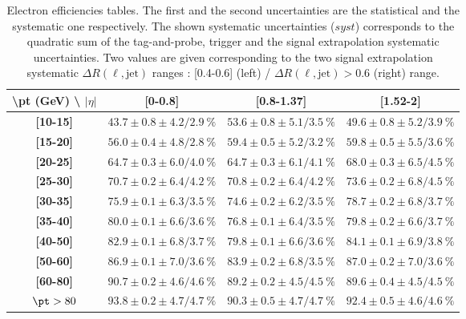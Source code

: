 \begin{table}[htb!]
	\begin{center}
\begin{tabular}{|c|c|c|c|}
\hline 
\textbf{\textbackslash{}pt (GeV) \textbackslash{} $|\eta|$} & \textbf{{[}0-0.8{]}} & \textbf{{[}0.8-1.37{]}} & \textbf{{[}1.52-2{]}}\tabularnewline
\hline 
\hline 
\textbf{{[}10-15{]}} & $43.7\pm0.8\pm4.2/2.9~\%$ & $53.6\pm0.8\pm5.1/3.5~\%$ & $49.6\pm0.8\pm5.2/3.9~\%$\tabularnewline
\hline 
\textbf{{[}15-20{]}} & $56.0\pm0.4\pm4.8/2.8~\%$ & $59.4\pm0.5\pm5.2/3.2~\%$ & $59.8\pm0.5\pm5.5/3.6~\%$\tabularnewline
\hline 
\textbf{{[}20-25{]}} & $64.7\pm0.3\pm6.0/4.0~\%$ & $64.7\pm0.3\pm6.1/4.1~\%$ & $68.0\pm0.3\pm6.5/4.5~\%$\tabularnewline
\hline 
\textbf{{[}25-30{]}} & $70.7\pm0.2\pm6.4/4.2~\%$ & $70.8\pm0.2\pm6.4/4.2~\%$ & $73.6\pm0.2\pm6.8/4.5~\%$\tabularnewline
\hline 
\textbf{{[}30-35{]}} & $75.9\pm0.1\pm6.3/3.5~\%$ & $74.6\pm0.2\pm6.2/3.5~\%$ & $78.7\pm0.2\pm6.8/3.7~\%$\tabularnewline
\hline 
\textbf{{[}35-40{]}} & $80.0\pm0.1\pm6.6/3.6~\%$ & $76.8\pm0.1\pm6.4/3.5~\%$ & $79.8\pm0.2\pm6.6/3.7~\%$\tabularnewline
\hline 
\textbf{{[}40-50{]}} & $82.9\pm0.1\pm6.8/3.7~\%$ & $79.8\pm0.1\pm6.6/3.6~\%$ & $84.1\pm0.1\pm6.9/3.8~\%$\tabularnewline
\hline 
\textbf{{[}50-60{]}} & $86.9\pm0.1\pm7.0/3.6~\%$ & $83.9\pm0.2\pm6.8/3.5~\%$ & $87.0\pm0.2\pm7.0/3.6~\%$\tabularnewline
\hline 
\textbf{{[}60-80{]}} & $90.7\pm0.2\pm4.6/4.6~\%$ & $89.2\pm0.2\pm4.5/4.5~\%$ & $89.6\pm0.4\pm4.5/4.5~\%$\tabularnewline
\hline 
\textbf{$\pt>80$}    & $93.8\pm0.2\pm4.7/4.7~\%$ & $90.3\pm0.5\pm4.7/4.7~\%$ & $92.4\pm0.5\pm4.6/4.6~\%$\tabularnewline
\hline 
\end{tabular}
        \end{center}
	\caption{ \label{tab:Real_Eff_electrons} Electron efficiencies tables. The first and the second uncertainties are the statistical and the systematic one respectively. The shown systematic uncertainties ($syst$) corresponds to the quadratic sum of the tag-and-probe, trigger and the signal extrapolation systematic uncertainties. Two values are given corresponding to the two signal extrapolation systematic  $\Delta R(\ell,\mathrm{jet})$ ranges : [0.4-0.6] (left) / $\Delta R(\ell,\mathrm{jet}) > 0.6$ (right) range.}
\end{table}


